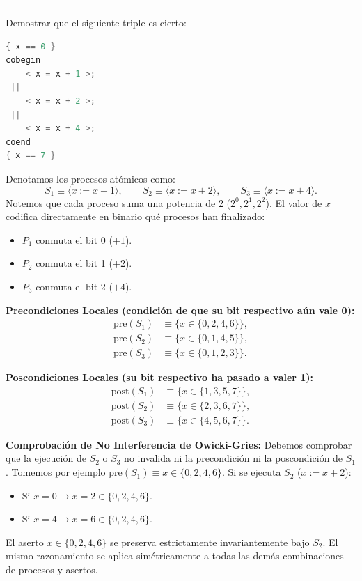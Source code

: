 \documentclass[11pt,a4paper,twoside,openright]{report}
\begin{document}
\vspace{15pt}
\hrule
\vspace{15pt}

\begin{ejercicio}
Demostrar que el siguiente triple es cierto:
\begin{lstlisting}[language=C++]
{ x == 0 }
cobegin
    < x = x + 1 >;
 ||
    < x = x + 2 >;
 ||
    < x = x + 4 >;
coend
{ x == 7 }
\end{lstlisting}
\end{ejercicio}

\begin{solucion}
Denotamos los procesos atómicos como:
\[
S_1 \equiv \langle x := x + 1 \rangle, \qquad S_2 \equiv \langle x := x + 2 \rangle, \qquad S_3 \equiv \langle x := x + 4 \rangle.
\]
Notemos que cada proceso suma una potencia de 2 ($2^0, 2^1, 2^2$). El valor de $x$ codifica directamente en binario qué procesos han finalizado:
\begin{itemize}
    \item $P_1$ conmuta el bit 0 ($+1$).
    \item $P_2$ conmuta el bit 1 ($+2$).
    \item $P_3$ conmuta el bit 2 ($+4$).
\end{itemize}

\textbf{Precondiciones Locales (condición de que su bit respectivo aún vale 0):}
\begin{align*}
\text{pre}(S_1) &\equiv \{x \in \{0, 2, 4, 6\}\}, \\
\text{pre}(S_2) &\equiv \{x \in \{0, 1, 4, 5\}\}, \\
\text{pre}(S_3) &\equiv \{x \in \{0, 1, 2, 3\}\}.
\end{align*}

\textbf{Poscondiciones Locales (su bit respectivo ha pasado a valer 1):}
\begin{align*}
\text{post}(S_1) &\equiv \{x \in \{1, 3, 5, 7\}\}, \\
\text{post}(S_2) &\equiv \{x \in \{2, 3, 6, 7\}\}, \\
\text{post}(S_3) &\equiv \{x \in \{4, 5, 6, 7\}\}.
\end{align*}

\textbf{Comprobación de No Interferencia de Owicki-Gries:}
Debemos comprobar que la ejecución de $S_2$ o $S_3$ no invalida ni la precondición ni la poscondición de $S_1$.
Tomemos por ejemplo $\text{pre}(S_1) \equiv x \in \{0, 2, 4, 6\}$. Si se ejecuta $S_2$ ($x := x + 2$):
\begin{itemize}
    \item Si $x = 0 \to x = 2 \in \{0, 2, 4, 6\}$.
    \item Si $x = 4 \to x = 6 \in \{0, 2, 4, 6\}$.
\end{itemize}
El aserto $x \in \{0, 2, 4, 6\}$ se preserva estrictamente invariantemente bajo $S_2$. El mismo razonamiento se aplica simétricamente a todas las demás combinaciones de procesos y asertos.


\end{solucion}
\end{document}

